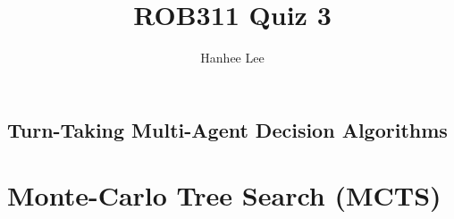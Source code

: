 \documentclass{article}
\title{ROB311 Quiz 3}
\author{Hanhee Lee}
\begin{document}
\maketitle

\tableofcontents
\newpage

\begin{center}
    \section*{Turn-Taking Multi-Agent Decision Algorithms}
\end{center}
\section{Monte-Carlo Tree Search (MCTS)}

\newpage
\end{document}
